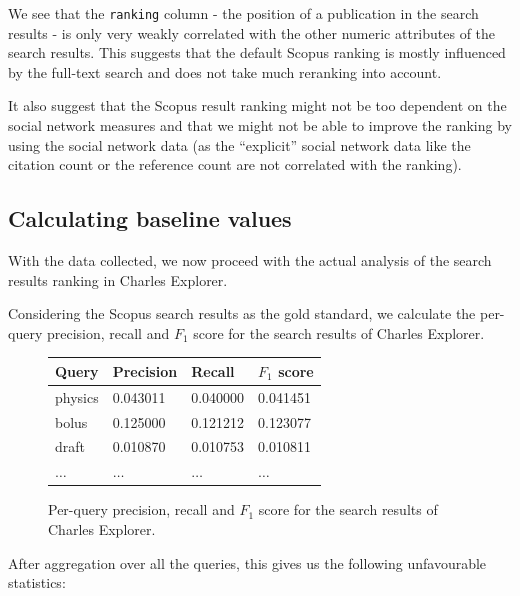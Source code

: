 We see that the \texttt{ranking} column - the position of a publication in the search results - is only very weakly correlated with the other numeric attributes of the search results.
This suggests that the default Scopus ranking is mostly influenced by the full-text search and does not take much reranking into account.

It also suggest that the Scopus result ranking might not be too dependent on the social network measures and that we might not be able to improve the ranking 
by using the social network data (as the ``explicit'' social network data like the citation count or the reference count are not correlated with the ranking).

\subsection{Calculating baseline values}

With the data collected, we now proceed with the actual analysis of the search results ranking in Charles Explorer.

Considering the Scopus search results as the gold standard, we calculate the per-query precision, recall and $F_1$ score for the search results of Charles Explorer.

\begin{figure}[!ht]
    \captionsetup{width=.9\linewidth}
    \centering
    \begin{tabular}{|l|l|l|l|}
    \hline
        \textbf{Query} & \textbf{Precision} & \textbf{Recall} & \textbf{$F_1$ score} \\ \hline
        physics & 0.043011 & 0.040000 & 0.041451 \\ \hline
        bolus & 0.125000 & 0.121212 & 0.123077 \\ \hline
        draft & 0.010870 & 0.010753 & 0.010811 \\ \hline
        $\hdots$ & $\hdots$ & $\hdots$ & $\hdots$ \\ \hline
    \end{tabular}
    \caption{Per-query precision, recall and $F_1$ score for the search results of Charles Explorer.}
\end{figure}

After aggregation over all the queries, this gives us the following unfavourable statistics:

